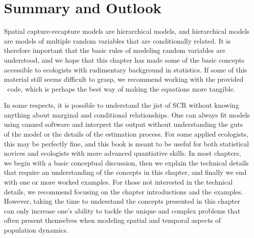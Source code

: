 \section{Summary and Outlook}


Spatial capture-recapture models are hierarchical models, and hierarchical
models are models of multiple random variables that are conditionally
related. It is therefore important that the basic rules of
modeling random variables are understood, and we hope that this chapter
has made some of the basic concepts accessible to ecologists with
rudimentary background in statistics. If some of this material still
seems difficult to grasp, we recommend working with the
provided \R~code, which is perhaps the best way of making the
equations more tangible.

In some respects, it is possible
to understand the jist of SCR without knowing anything about marginal
and conditional relationships. One can always fit models using canned
software and interpret the output without understanding the guts of
the model or the details of the estimation process. For some applied
ecologists, this may be perfectly fine, and this book is meant to be
useful for both statistical novices and ecologists with more advanced
quantiative skills. In most chapters, we begin with a basic conceptual
discussion, then we explain
the technical details that require an understanding of the concepts in
this chapter, and finally we end with one or more worked examples. For
those not interested in the technical details, we recommend focusing
on the chapter introductions and the examples. However, taking the
time to understand the concepts presented in this chapter can only
increase one's ability to tackle the unique and complex problems that
often present themselves when modeling spatial and temporal aspects of
population dynamics.


